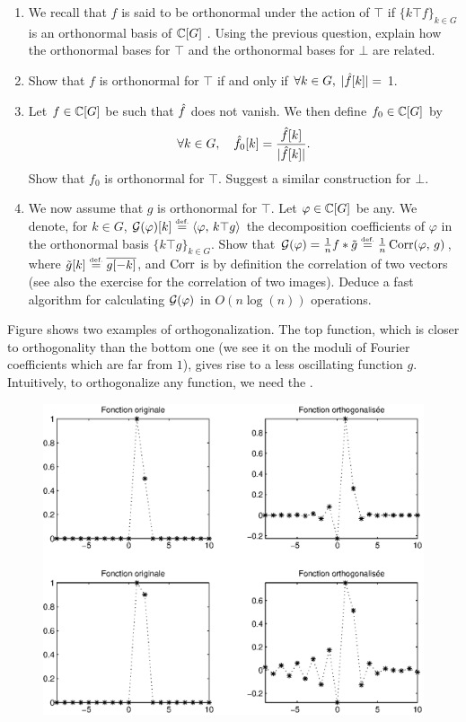 \begin{exo}
\begin{enumerate}
\item We recall that $ f $ is said to be orthonormal under the action of $ \top $ if $ \{k \top f\}_{k \in G} $ is an orthonormal basis of $ \mathbb{C} [G] $ . Using the previous question, explain how the orthonormal bases for $ \top $ and the orthonormal bases for $ \bot $ are related.
\item Show that $ f $ is orthonormal for $ \top $ if and only if $ \forall k \in G, \; | \hat{f}[k] | = $ 1.
\item Let $ f \in \mathbb{C} [G] $ be such that $ \hat{f} $ does not vanish. We then define $ f_0 \in \mathbb{C} [G] $ by
\begin{equation*}
\forall k \in G, \quad \hat{f_0}[k] = \frac{\hat{f}[k]}{| \hat{f}[k] |}.
\end{equation*}
Show that $ f_0 $ is orthonormal for $ \top $. Suggest a similar construction for $ \bot $.
\item {} We now assume that $ g $ is orthonormal for $ \top $. Let $ \varphi \in \mathbb{C} [G] $ be any. We denote, for $ k \in G $, $ \mathcal{G} (\varphi) [k] \stackrel{\mbox{\upshape\tiny def.}}{=} \langle \varphi,\,k \top g\rangle $ the decomposition coefficients of $ \varphi $ in the orthonormal basis $ \{k \top g\}_{k \in G} $. Show that $ \mathcal{G} (\varphi) = \frac{1}{n} f * \tilde{g} \stackrel{\mbox{\upshape\tiny def.}}{=} \frac{1}{n} \operatorname{Corr} (\varphi, \, g) $, where $ \tilde{g}[k] \stackrel{\mbox{\upshape\tiny def.}}{=} \overline{g [-k]} $, and $ \operatorname{Corr} $ is by definition the correlation of two vectors (see also the exercise  for the correlation of two images). Deduce a fast algorithm for calculating $ \mathcal{G} (\varphi) $ in $ O(n \log (n)) $ operations.
\end{enumerate} Figure  shows two examples of orthogonalization. The top function, which is closer to orthogonality than the bottom one (we see it on the moduli of Fourier coefficients which are far from $ 1 $), gives rise to a less oscillating function $ g $. Intuitively, to orthogonalize any function, we need the . \begin{figure}[ht]
    \begin{center}
    \includegraphics[scale=0.5]{images/orthogonalisation-fourier.eps}

\end{center}
\end{figure}
\end{exo}
